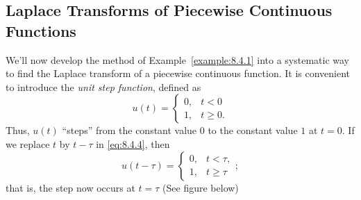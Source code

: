 \documentclass{ximera}
\begin{document}
\subsection*{Laplace Transforms of Piecewise Continuous Functions}

We'll now develop the method of Example~\ref{example:8.4.1} into a
systematic way to find the Laplace transform of a piecewise continuous
function. It is convenient to introduce the \textit{unit step
function}, defined as
\begin{equation}\label{eq:8.4.4}
u(t)=\left\{\begin{array}{rl}
0,&t<0\\
1,&t\geq 0.
\end{array}\right.
\end{equation}
Thus, $u(t)$ ``steps'' from the constant value $0$ to the constant
value $1$ at $t=0$. If we replace $t$ by
$t-\tau$ in \eqref{eq:8.4.4}, then
$$
u(t-\tau)=\left\{\begin{array}{rl}
0,&t<\tau,\\
1,&t\geq \tau
\end{array}\right.;
$$
that is, the step now occurs at $t=\tau$ (See figure below) %

\begin{center}
\end{center}

\end{document}
